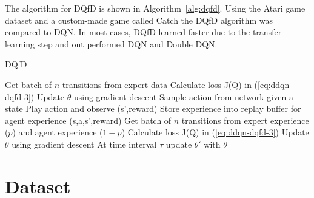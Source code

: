 \documentclass[12pt,american]{report}
\begin{document}
The algorithm for DQfD is shown in Algorithm~\ref{alg:dqfd}. Using the Atari game dataset and a custom-made game called Catch the DQfD algorithm was compared to DQN.  In most cases, DQfD learned faster due to the transfer learning step and out performed DQN and Double DQN.
\begin{algorithm}
\caption{DQfD}
\label{alg:dqfd}
\begin{algorithmic} 
\State Get batch of $n$ transitions from expert data
\State Calculate loss J(Q) in (\ref{eq:ddqn-dqfd-3})
\State Update $\theta$ using gradient descent
\EndFor
{}
\State Sample action from network given a state
\State Play action and observe (s',reward)
\State Store experience into replay buffer for agent experience (s,a,s',reward)
\State Get batch of $n$ transitions from expert experience ($p$) and agent experience ($1-p$)
\State Calculate loss J(Q) in (\ref{eq:ddqn-dqfd-3})
\State Update $\theta$ using gradient descent
\State At time interval $\tau$ update $\theta'$ with $\theta$
\EndFor
\end{algorithmic}
\end{algorithm}


\chapter{Dataset}
\label{sec:dataset}
\end{document}
